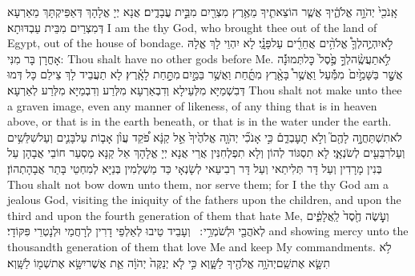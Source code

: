 {אָֽנֹכִ֖י֙ יְהֹוָ֣ה אֱלֹהֶ֑֔יךָ אֲשֶׁ֧ר הוֹצֵאתִ֛יךָ מֵאֶ֥רֶץ מִצְרַ֖יִם מִבֵּ֣֥ית עֲבָדִ֑͏ֽים׃}
{אֲנָא יְיָ אֱלָהָךְ דְּאַפֵּיקְתָּךְ מֵאַרְעָא דְּמִצְרַיִם מִבֵּית עַבְדּוּתָא׃}
{I am the \lord\space thy God, who brought thee out of the land of Egypt, out of the house of bondage.}{}
{לֹ֣א\maqqaf יִהְיֶ֥͏ֽה\maqqaf לְךָ֛֩ אֱלֹהִ֥֨ים אֲחֵרִ֖֜ים עַל\maqqaf פָּנָֽ֗͏ַי׃}
{לָא יִהְוֵי לָךְ אֱלָהּ אָחֳרָן בָּר מִנִּי:}
{Thou shalt have no other gods before Me.}{}
{לֹֽ֣א\maqqaf תַעֲשֶֽׂ֨ה\maqqaf לְךָ֥֣ פֶ֣֙סֶל֙ \pasek  כׇּל\maqqaf תְּמוּנָ֔֡ה אֲשֶׁ֤֣ר בַּשָּׁמַ֣֙יִם֙ \pasek  מִמַּ֔֡עַל וַאֲשֶׁ֥ר֩ בָּאָ֖֨רֶץ מִתָּ֑֜͏ַחַת וַאֲשֶׁ֥ר בַּמַּ֖֣יִם \legarmeh  מִתַּ֥֣חַת לָאָֽ֗רֶץ׃}
{לָא תַעֲבֵיד לָךְ צֵילַם כָּל דְּמוּ דְּבִשְׁמַיָּא מִלְּעֵילָא וְדִבְאַרְעָא מִלְּרַע וְדִבְמַיָּא מִלְּרַע לְאַרְעָא׃}
{Thou shalt not make unto thee a graven image, even any manner of likeness, of any thing that is in heaven above, or that is in the earth beneath, or that is in the water under the earth.}{}
{לֹא\maqqaf תִשְׁתַּחֲוֶ֥֣ה לָהֶ֖ם֮ וְלֹ֣א תׇעׇבְדֵ֑ם֒ כִּ֣י אָנֹכִ֞י יְהֹוָ֤ה אֱלֹהֶ֙יךָ֙ אֵ֣ל קַנָּ֔א פֹּ֠קֵד עֲוֺ֨ן אָב֧וֹת עַל\maqqaf בָּנִ֛ים וְעַל\maqqaf שִׁלֵּשִׁ֥ים וְעַל\maqqaf רִבֵּעִ֖ים לְשֹׂנְאָֽ֑י׃}
{לָא תִסְגּוֹד לְהוֹן וְלָא תִפְלְחִנִּין אֲרֵי אֲנָא יְיָ אֱלָהָךְ אֵל קַנָּא מַסְעַר חוֹבֵי אֲבָהָן עַל בְּנִין מָרָדִין וְעַל דָּר תְּלִיתַאי וְעַל דָּר רְבִיעַאי לְשָׂנְאָי כַּד מַשְׁלְמִין בְּנַיָּא לְמִחְטֵי בָּתַר אֲבָהָתְהוֹן׃}
{Thou shalt not bow down unto them, nor serve them; for I the \lord\space thy God am a jealous God, visiting the iniquity of the fathers upon the children, and upon the third and upon the fourth generation of them that hate Me,}{}
{וְעֹ֥֤שֶׂה חֶ֖֙סֶד֙ לַֽאֲלָפִ֑֔ים לְאֹהֲבַ֖י וּלְשֹׁמְרֵ֥י ׃ \setuma }
{וְעָבֵיד טֵיבוּ לְאַלְפֵי דָרִין לְרָחֲמַי וּלְנָטְרֵי פִּקּוֹדָי׃}
{and showing mercy unto the thousandth generation of them that love Me and keep My commandments.}{}
{לֹ֥א תִשָּׂ֛א אֶת\maqqaf שֵֽׁם\maqqaf יְהֹוָ֥ה אֱלֹהֶ֖יךָ לַשָּׁ֑וְא כִּ֣י לֹ֤א יְנַקֶּה֙ יְהֹוָ֔ה אֵ֛ת אֲשֶׁר\maqqaf יִשָּׂ֥א אֶת\maqqaf שְׁמ֖וֹ לַשָּֽׁוְא׃ \setuma }
